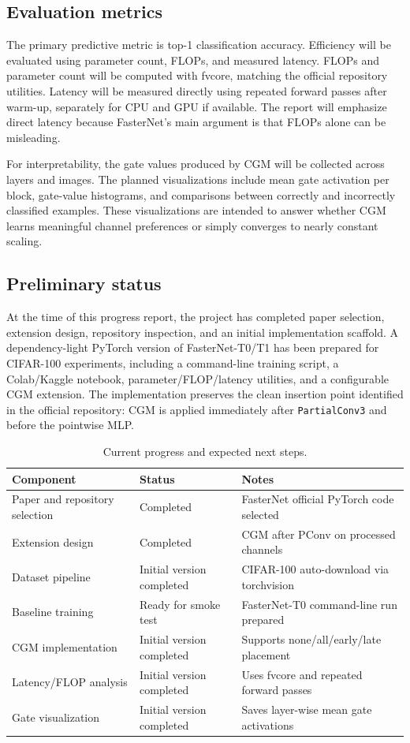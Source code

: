 \documentclass{article}
\begin{document}
\subsection{Evaluation metrics}

The primary predictive metric is top-1 classification accuracy. Efficiency will be evaluated using parameter count, FLOPs, and measured latency. FLOPs and parameter count will be computed with fvcore, matching the official repository utilities. Latency will be measured directly using repeated forward passes after warm-up, separately for CPU and GPU if available. The report will emphasize direct latency because FasterNet's main argument is that FLOPs alone can be misleading.

For interpretability, the gate values produced by CGM will be collected across layers and images. The planned visualizations include mean gate activation per block, gate-value histograms, and comparisons between correctly and incorrectly classified examples. These visualizations are intended to answer whether CGM learns meaningful channel preferences or simply converges to nearly constant scaling.

\subsection{Preliminary status}

At the time of this progress report, the project has completed paper selection, extension design, repository inspection, and an initial implementation scaffold. A dependency-light PyTorch version of FasterNet-T0/T1 has been prepared for CIFAR-100 experiments, including a command-line training script, a Colab/Kaggle notebook, parameter/FLOP/latency utilities, and a configurable CGM extension. The implementation preserves the clean insertion point identified in the official repository: CGM is applied immediately after \texttt{PartialConv3} and before the pointwise MLP.

\begin{table}[t]
\caption{Current progress and expected next steps.}
\label{tab:progress}
\centering
\begin{tabular}{lll}
\toprule
Component & Status & Notes \\
\midrule
Paper and repository selection & Completed & FasterNet official PyTorch code selected \\
Extension design & Completed & CGM after PConv on processed channels \\
Dataset pipeline & Initial version completed & CIFAR-100 auto-download via torchvision \\
Baseline training & Ready for smoke test & FasterNet-T0 command-line run prepared \\
CGM implementation & Initial version completed & Supports none/all/early/late placement \\
Latency/FLOP analysis & Initial version completed & Uses fvcore and repeated forward passes \\
Gate visualization & Initial version completed & Saves layer-wise mean gate activations \\
\bottomrule
\end{tabular}
\end{table}
\end{document}
